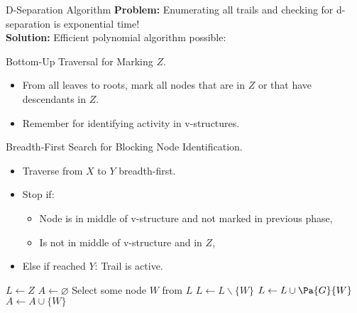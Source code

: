 \begin{frame}{D-Separation Algorithm}
\textbf{Problem:} Enumerating all trails and checking for d-separation is exponential time! \\
\textbf{Solution:} Efficient polynomial algorithm possible:
\begin{description}
\pause \item[Phase I:] Bottom-Up Traversal for Marking $Z$.
\begin{itemize}
\pause \item From all leaves to roots, mark all nodes that are in $Z$ or that have descendants in $Z$.
\pause \item Remember for identifying activity in v-structures.
\end{itemize}
\pause \item[Phase II:] Breadth-First Search for Blocking Node Identification.
\begin{itemize}
    \pause \item Traverse from $X$ to $Y$ breadth-first.
    \pause \item Stop if:
\begin{itemize}
    \item Node is in middle of v-structure and not marked in previous phase,
    \item Is not in middle of v-structure and in $Z$,
\end{itemize}
    \pause \item Else if reached $Y$: Trail is active.
\end{itemize}
\end{description}
\pause
\color{gray!90}
\begin{algorithm}[H]
\caption{D-Separation Phase I}
$L \leftarrow Z$ 
$A \leftarrow \varnothing$ 
{
Select some node $W$ from $L$\;
$L \leftarrow L\backslash \{W\}$\;
{
    $L \leftarrow L \cup \Pa{G}{W}$\;
    $A \leftarrow A \cup \{W\}$\;
}
}
\end{algorithm}
\end{frame}

